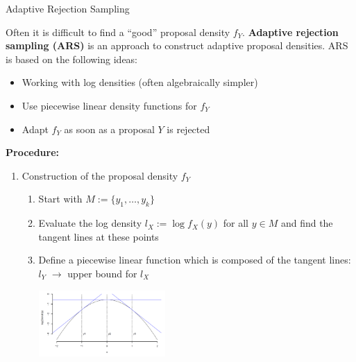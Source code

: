 \begin{vbframe}{Adaptive Rejection Sampling}

Often it is difficult to find a \enquote{good} proposal density $f_Y$. \textbf{Adaptive rejection sampling (ARS)} is an approach to construct adaptive proposal densities. ARS is based on the following ideas:

\begin{itemize}
\item Working with log densities (often algebraically simpler)
\item Use piecewise linear density functions for $f_Y$
\item Adapt $f_Y$ as soon as a proposal $Y$ is rejected
\end{itemize}

\framebreak

\textbf{Procedure:}
\begin{enumerate}
\item Construction of the proposal density $f_Y$
\begin{enumerate}
\item Start with $M := \{y_1,\ldots, y_k\}$
\item Evaluate the log density $l_X := \log f_X(y)$ for all $y \in M$ and find the tangent lines at these points
\item Define a piecewise linear function which is composed of the tangent lines: $l_Y$ $\to$ upper bound for $l_X$


\begin{center}
\includegraphics[width =0.4\textwidth]{figure_man/adaptive-rejection.png}
\end{center}








\end{enumerate}
\end{enumerate}
\end{vbframe}
